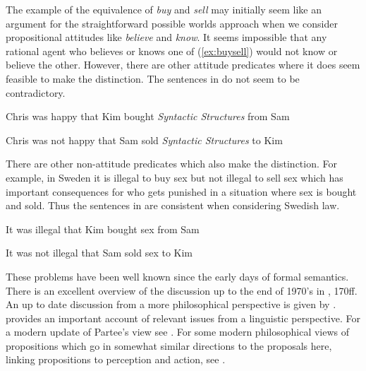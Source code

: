 The example of the equivalence of \textit{buy} and \textit{sell} may
initially seem like an argument for the straightforward possible worlds
approach when we consider propositional attitudes like
\textit{believe} and \textit{know}. It seems impossible that any rational agent
who believes or knows one of (\ref{ex:buysell}) would not know or
believe the other.  However, there are other attitude predicates where
it does seem feasible to make the distinction.  The sentences in
\nexteg{} do not seem to be contradictory.
\begin{ex} 
\begin{subex} 
 
\item Chris was happy that Kim bought \textit{Syntactic Structures}
  from Sam 
 
\item Chris was not happy that Sam sold \textit{Syntactic Structures}
  to Kim 
 
\end{subex} 
   
\end{ex} 
There are other non-attitude predicates which also make the
distinction.  For example, in Sweden it is illegal to buy sex but not
illegal to sell sex which has important consequences for who gets
punished in a situation where sex is bought and sold.  Thus the
sentences in \nexteg{} are consistent when considering Swedish law.
\begin{ex} 
\begin{subex} 
 
\item It was illegal that Kim bought sex from Sam 
 
\item It was not illegal that Sam sold sex to Kim 
 
\end{subex} 
\label{ex:illegalsex}  
\end{ex} 
    

These problems have been well known since the early days of formal
semantics.  There is an excellent overview of the discussion up to the
end of 1970's in \cite{DowtyWallPeters1981}, 170ff.  An up to date
discussion from a more philosophical perspective is given by \cite{Egre2020}.
\cite{Partee1979} provides an important account of relevant issues
from a linguistic perspective.
For a modern update of Partee's view see \cite{Partee2014}.  For some
modern philosophical views of propositions which go in somewhat
similar directions to the proposals here, linking propositions to
perception and action, see \cite{KingSoamesSpeaks2014}.


